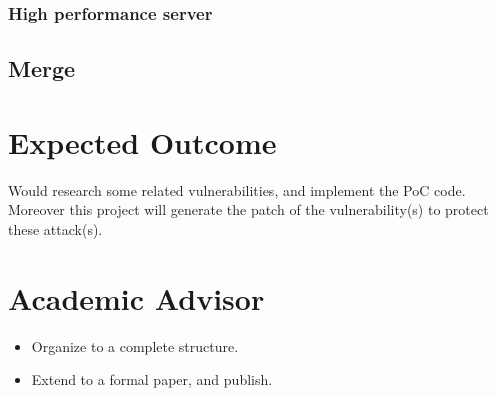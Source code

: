 \documentclass[12pt,a4paper]{IEEEconf}
\begin{document}
\subsubsection{High performance server}

\subsection{Merge}


\section{Expected Outcome}
Would research some related vulnerabilities, and implement the PoC code.
Moreover this project will generate the patch of the vulnerability(s) to protect these attack(s).

\printbibheading[heading=bibnumbered]
\printbibliography\newrefcontext

\section{Academic Advisor}
\begin{itemize}
  \item Organize to a complete structure.
  \item Extend to a formal paper, and publish.
\end{itemize}
\end{document}
